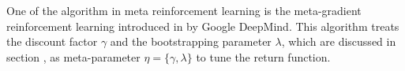 One of the algorithm in meta reinforcement learning is the meta-gradient reinforcement learning introduced in \cite{meta-gradient} by Google DeepMind. This algorithm treats the discount factor $\gamma$ and the bootstrapping parameter $\lambda$, which are discussed in section , as meta-parameter $\eta = \{\gamma, \lambda\}$ to tune the return function.